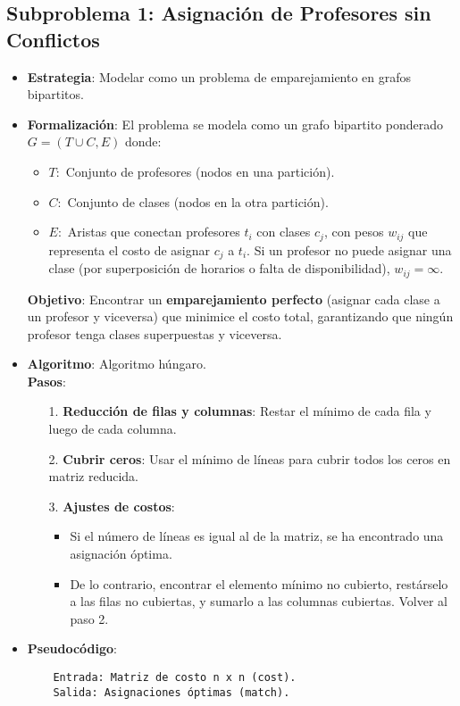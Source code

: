 \documentclass[12pt, a4paper]{article}
\begin{document}
\subsection{Subproblema 1: Asignación de Profesores sin Conflictos}
\begin{itemize}
    \item \textbf{Estrategia}: Modelar como un problema de emparejamiento en grafos bipartitos.
    \item \textbf{Formalización}:
    El problema se modela como un grafo bipartito ponderado $G=(T\cup C,E)$ donde:
    \begin{itemize}
        \item$T:$ Conjunto de profesores (nodos en una partición).
        \item$C:$ Conjunto de clases (nodos en la otra partición).
        \item$E:$ Aristas que conectan profesores $t_i$ con clases $c_j$, con pesos $w_{ij}$ que representa el costo de asignar $c_j$ a $t_i$. Si un profesor no puede asignar una clase (por superposición de horarios o falta de disponibilidad), $w_{ij} = \infty$.
    \end{itemize}
    \textbf{Objetivo}: Encontrar un \textbf{emparejamiento perfecto} (asignar cada clase a un profesor y viceversa) que minimice el costo total, garantizando que ningún profesor tenga clases superpuestas y viceversa.
    \item \textbf{Algoritmo}: Algoritmo húngaro.\\
    \textbf{Pasos}:
    \begin{itemize}
        \item[1.] \textbf{Reducción de filas y columnas}: Restar el mínimo de cada fila y luego de cada columna.
        \item[2.] \textbf{Cubrir ceros}: Usar el mínimo de líneas para cubrir todos los ceros en matriz reducida.
        \item[3.] \textbf{Ajustes de costos}:
        \begin{itemize}
            \item Si el número de líneas es igual al de la matriz, se ha encontrado una asignación óptima.
            \item De lo contrario, encontrar el elemento mínimo no cubierto, restárselo a las filas no cubiertas, y sumarlo a las columnas cubiertas. Volver al paso 2.
        \end{itemize}
    \end{itemize}
    \item \textbf{Pseudocódigo}:
    \begin{verbatim}
    Entrada: Matriz de costo n x n (cost).
    Salida: Asignaciones óptimas (match).
    

\end{verbatim}
\end{itemize}
\end{document}
